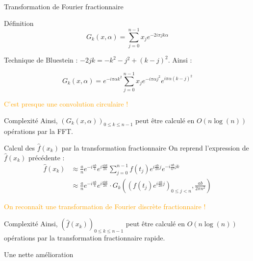 \documentclass{beamer}
\begin{document}
\begin{frame}{Transformation de Fourier fractionnaire}
\begin{block}{Définition}
  $$G_k(x, \alpha)
  = \sum_{j=0}^{n-1}x_je^{-2i\pi jk\alpha} $$
\end{block}

Technique de Bluestein : $-2jk = - k^2 -j^2 + (k-j)^2 $. Ainsi :

$$G_k(x, \alpha) = e^{-i\pi \alpha k^2 } \sum_{j=0}^{n-1}x_je^{-i\pi\alpha j^2} e^{i\pi\alpha (k-j)^2}$$
\begin{center}
    \textcolor{orange}{C'est presque une convolution circulaire !}
\end{center}

\begin{exampleblock}{Complexité}
    Ainsi, $(G_k(x, \alpha))_{0\le k\le n-1}$ peut être calculé en $O(n\log(n))$ opérations par la FFT.
\end{exampleblock}
\end{frame}

\begin{frame}{Calcul des $\hat{f}(x_k)$ par la transformation fractionnaire}
    On reprend l'expression de $\hat{f}(x_k)$ précédente :
    \begin{align*}
        \hat{f}(x_k) &\approx \frac{a}{n} e^{-i\frac{ab}{4}}e^{i\frac{abk}{2n}}\sum_{j=0}^{n-1}f(t_j)e^{i\frac{ab}{2n}j}e^{-i\frac{ab}{n^2}jk} \\
         &\approx \frac{a}{n} e^{-i\frac{ab}{4}}e^{i\frac{abk}{2n}}\cdot G_k\left(\left( f(t_j)e^{i \frac{ab}{2n}j}\right)_{0 \le j < n},  \frac{ab}{2\pi n^2}\right) 
    \end{align*}
    \begin{center}
        \textcolor{orange}{On reconnaît une transformation de Fourier discrète fractionnaire !}
\end{center}
\begin{exampleblock}{Complexité}
  Ainsi, $(\hat{f}(x_k))_{0\le k\le n-1}$ peut être calculé en $O(n\log(n))$ opérations par la transformation fractionnaire rapide.
\end{exampleblock}
\end{frame}

\begin{frame}{Une nette amélioration}
\end{frame}
\end{document}

